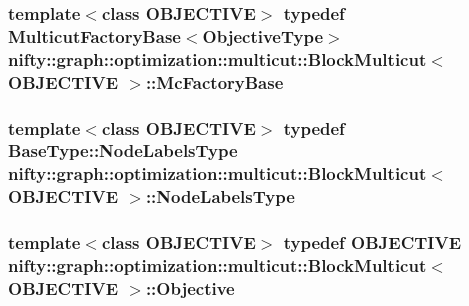 \subsubsection[{Mc\+Factory\+Base}]{\setlength{\rightskip}{0pt plus 5cm}template$<$class O\+B\+J\+E\+C\+T\+I\+V\+E$>$ typedef Multicut\+Factory\+Base$<${\bf Objective\+Type}$>$ {\bf nifty\+::graph\+::optimization\+::multicut\+::\+Block\+Multicut}$<$ O\+B\+J\+E\+C\+T\+I\+V\+E $>$\+::{\bf Mc\+Factory\+Base}}\label{classnifty_1_1graph_1_1optimization_1_1multicut_1_1BlockMulticut_a568ee0171f58ef95b5b32a4d15aaf2f5}
\hypertarget{classnifty_1_1graph_1_1optimization_1_1multicut_1_1BlockMulticut_a8578c7f9e0703298373936d2697043c9}{}
\subsubsection[{Node\+Labels\+Type}]{\setlength{\rightskip}{0pt plus 5cm}template$<$class O\+B\+J\+E\+C\+T\+I\+V\+E$>$ typedef {\bf Base\+Type\+::\+Node\+Labels\+Type} {\bf nifty\+::graph\+::optimization\+::multicut\+::\+Block\+Multicut}$<$ O\+B\+J\+E\+C\+T\+I\+V\+E $>$\+::{\bf Node\+Labels\+Type}}\label{classnifty_1_1graph_1_1optimization_1_1multicut_1_1BlockMulticut_a8578c7f9e0703298373936d2697043c9}
\hypertarget{classnifty_1_1graph_1_1optimization_1_1multicut_1_1BlockMulticut_a4687a9c2304a995a612e69abc3b1b37f}{}
\subsubsection[{Objective}]{\setlength{\rightskip}{0pt plus 5cm}template$<$class O\+B\+J\+E\+C\+T\+I\+V\+E$>$ typedef O\+B\+J\+E\+C\+T\+I\+V\+E {\bf nifty\+::graph\+::optimization\+::multicut\+::\+Block\+Multicut}$<$ O\+B\+J\+E\+C\+T\+I\+V\+E $>$\+::{\bf Objective}}\label{classnifty_1_1graph_1_1optimization_1_1multicut_1_1BlockMulticut_a4687a9c2304a995a612e69abc3b1b37f}
\hypertarget{classnifty_1_1graph_1_1optimization_1_1multicut_1_1BlockMulticut_abaa8f874df71e8fc875ddc3928768f92}{}
